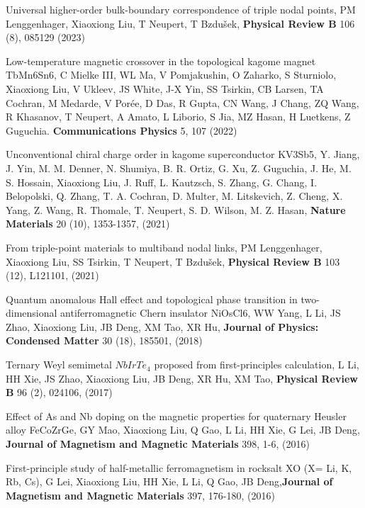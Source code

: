 \documentclass[11pt,a4paper,sans]{moderncv} %
\begin{document}
\begin{etaremune}
  
  \item Universal higher-order bulk-boundary correspondence of triple nodal points, PM Lenggenhager, \textcolor{cvblue}{Xiaoxiong Liu}, T Neupert, T Bzdušek, \textbf{Physical Review B} 106 (8), 085129 (2023)
  
  \item Low-temperature magnetic crossover in the topological kagome magnet TbMn6Sn6, C Mielke III, WL Ma, V Pomjakushin, O Zaharko, S Sturniolo,  \textcolor{cvblue}{Xiaoxiong Liu}, V Ukleev, JS White, J-X Yin, SS Tsirkin, CB Larsen, TA Cochran, M Medarde, V Porée, D Das, R Gupta, CN Wang, J Chang, ZQ Wang, R Khasanov, T Neupert, A Amato, L Liborio, S Jia, MZ Hasan, H Luetkens, Z Guguchia. \textbf{Communications Physics}  5, 107 (2022)
 
  
  \item Unconventional chiral charge order in kagome superconductor KV3Sb5, Y. Jiang, J. Yin, M. M. Denner, N. Shumiya, B. R. Ortiz, G. Xu, Z. Guguchia, J. He, M. S. Hossain, \textcolor{cvblue}{Xiaoxiong Liu}, J. Ruff, L. Kautzsch, S. Zhang, G. Chang, I. Belopolski, Q. Zhang, T. A. Cochran, D. Multer, M. Litskevich, Z. Cheng, X. Yang, Z. Wang, R. Thomale, T. Neupert, S. D. Wilson, M. Z. Hasan, \textbf{Nature Materials} 20 (10), 1353-1357, (2021)
  
  \item From triple-point materials to multiband nodal links, PM Lenggenhager, \textcolor{cvblue}{Xiaoxiong Liu}, SS Tsirkin, T Neupert, T Bzdušek, \textbf{Physical Review B} 103 (12), L121101, (2021)
  

  
  \item Quantum anomalous Hall effect and topological phase transition in two-dimensional antiferromagnetic Chern insulator NiOsCl6, WW Yang, L Li, JS Zhao, \textcolor{cvblue}{Xiaoxiong Liu}, JB Deng, XM Tao, XR Hu, \textbf{Journal of Physics: Condensed Matter} 30 (18), 185501, (2018)
  

  
  \item Ternary Weyl semimetal $NbIrTe_4$ proposed from first-principles calculation, L Li, HH Xie, JS Zhao, \textcolor{cvblue}{Xiaoxiong Liu}, JB Deng, XR Hu, XM Tao, \textbf{Physical Review B} 96 (2), 024106, (2017)
  

  
  \item Effect of As and Nb doping on the magnetic properties for quaternary Heusler alloy FeCoZrGe, GY Mao, \textcolor{cvblue}{Xiaoxiong Liu}, Q Gao, L Li, HH Xie, G Lei, JB Deng, \textbf{Journal of Magnetism and Magnetic Materials} 398, 1-6, (2016)
  
  \item First-principle study of half-metallic ferromagnetism in rocksalt XO (X= Li, K, Rb, Cs), G Lei, \textcolor{cvblue}{Xiaoxiong Liu}, HH Xie, L Li, Q Gao, JB Deng,\textbf{Journal of Magnetism and Magnetic Materials} 397, 176-180, (2016)

\end{etaremune}









\end{document}
